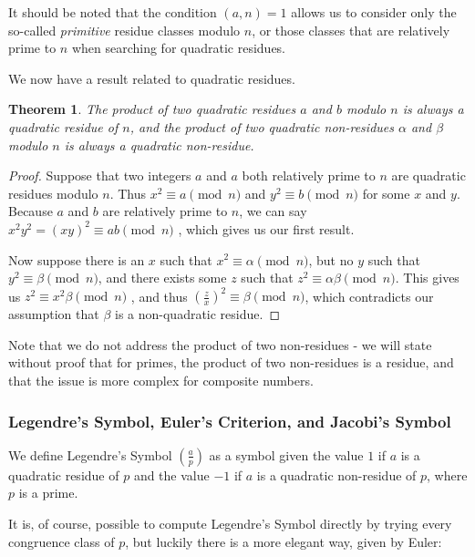 \documentclass{article}
\newtheorem*{theorem}{Theorem}
\begin{document}
\par It should be noted that the condition $(a,n) = 1$ allows us to consider only the so-called \textit{primitive} residue classes modulo $n$, or those classes that are relatively prime to $n$ when searching for quadratic residues. 

\par We now have a result related to quadratic residues.
 \begin{theorem}
 The product of two quadratic residues $a$ and $b$ modulo $n$ is always a quadratic residue of $n$, and the product of two quadratic non-residues $\alpha$ and $\beta$ modulo $n$ is always a quadratic non-residue.
 \end{theorem}
 \begin{proof}
 Suppose that two integers $a$ and $a$ both relatively prime to $n$ are quadratic residues modulo $n$. Thus $x^2 \equiv a
  \pmod n$ and $y^2 \equiv b \pmod n$ for some $x$ and $y$. Because $a$ and $b$ are relatively prime to $n$, we can say
   $x^2y^2 = (xy)^2 \equiv ab \pmod n$ , which gives us our first result.
 \par Now suppose there is an $x$ such that  $x^2 \equiv \alpha \pmod n$, but no $y$ such that  $y^2 \equiv \beta \pmod n$,
  and there exists some $z$ such that $z^2 \equiv \alpha\beta \pmod n$. This gives us $z^2 \equiv x^2 \beta \pmod n$ , and thus 
  $\left( \frac{z}{x} \right)^2 \equiv \beta \pmod n$, which contradicts our assumption that $\beta$ is a non-quadratic residue.
 \end{proof}
 
 \par Note that we do not address the product of two non-residues - we will state without proof that for primes, the product of two non-residues is a residue, and that the issue is more complex for composite numbers. 
 
 
\subsubsection*{Legendre's Symbol, Euler's Criterion, and Jacobi's Symbol}
We define Legendre's Symbol $\left( \frac{a}{p} \right)$ as a symbol given the value $1$ if $a$ is a quadratic residue of $p$ and the value $-1$ if $a$ is a quadratic non-residue of $p$, where $p$ is a prime.
\par It is, of course, possible to compute Legendre's Symbol directly by trying every congruence class of $p$, but luckily there is a more elegant way, given by Euler:
\end{document}
